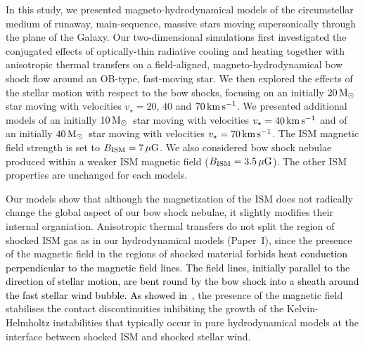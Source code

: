\documentclass[useAMS,usenatbib]{mn2e}
\begin{document}
In this study, we present\textcolor{black}{ed} magneto-hydrodynamical models of the
circumstellar medium of runaway, main-sequence, massive stars moving
supersonically through the plane of the Galaxy. Our two-dimensional simulations first
investigate\textcolor{black}{d} the conjugated effects of optically-thin radiative cooling and
heating together with anisotropic thermal transfers on a field-aligned, 
magneto-hydrodynamical bow shock flow around an OB-type, fast-moving star. We
then explore\textcolor{black}{d} the effects of the stellar motion with respect to the bow shocks, 
focusing on an initially $20\, \rm M_{\odot}$ star moving with velocities
$v_{\star}=20$, $40$ and $70\, \rm km\, \rm s^{-1}$. We present\textcolor{black}{ed} additional
models of an initially $10\, \rm M_{\odot}$~\textcolor{black}{star} moving with velocities
$v_{\star}=40\, \rm km\, \rm s^{-1}$ and of an initially $40\, \rm M_{\odot}$~\textcolor{black}{star} 
moving with velocities $v_{\star}=70\, \rm km\, \rm s^{-1}$. The ISM magnetic
field strength is set to $B_{\rm ISM}=7\, \mu \rm G$. We also
consider\textcolor{black}{ed} bow shock nebulae produced within a weaker ISM magnetic field ($B_{\rm
ISM}=3.5\, \mu \rm G$). The other ISM properties are unchanged for each models. 


Our models show that although the magnetization of the ISM does not radically
change the global aspect of our bow shock nebulae, it slightly modifies their
internal organiation. Anisotropic thermal transfers do not split the region of
shocked ISM gas as in our hydrodynamical models (Paper~I), since the presence of
the magnetic field in the regions of shocked material \textcolor{black}{forbids heat 
conduction perpendicular to the magnetic field lines}. 
\textcolor{black}{The field lines, initially parallel to the direction of stellar
motion, are bent round by the bow shock into a sheath around
the fast stellar wind bubble.}
\textcolor{black}{As showed in~\citet{heitsch_apj_665_2007}}, the presence 
of the magnetic field stabilises \textcolor{black}{the} contact
discontinuities inhibiting the growth of the Kelvin-Helmholtz instabilities that typically
occur in pure hydrodynamical models at the interface between shocked ISM and shocked stellar wind. 

\end{document}
